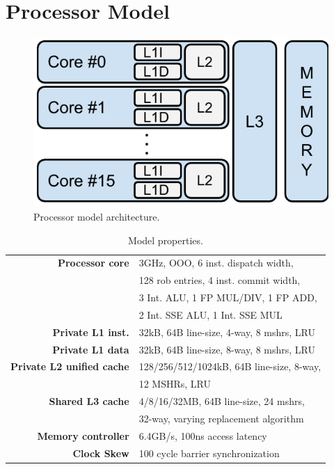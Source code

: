\section{Processor Model}
\label{sec:methodology:processor_model}

\begin{figure}[ht]
\centering
\includegraphics[scale=.65]{figures/processor_model/processor_model}
\caption{Processor model architecture.}
\label{fig:processor_model}
\end{figure}

\begin{table}[ht]
\centering
\begin{tabular}{rl}
\toprule
\bf{Processor core}                 & 3GHz, OOO, 6 inst. dispatch width,     \\
                                    & 128 rob entries, 4 inst. commit width, \\
                                    & 3 Int. ALU, 1 FP MUL/DIV, 1 FP ADD, \\
                                    & 2 Int. SSE ALU, 1 Int. SSE MUL \\
\bf{Private L1 inst.}               & 32kB, 64B line-size, 4-way, 8 mshrs, LRU \\
\bf{Private L1 data}                & 32kB, 64B line-size, 8-way, 8 mshrs, LRU \\
\bf{Private L2 unified cache}       & 128/256/512/1024kB, 64B line-size, 8-way, \\
                                    & 12 MSHRs, LRU      \\
\bf{Shared L3 cache}                & 4/8/16/32MB, 64B line-size, 24 mshrs, \\
                                    & 32-way, varying replacement algorithm         \\
\bf{Memory controller}              & 6.4GB/s, 100ns access latency         \\
\bf{Clock Skew}                     & 100 cycle barrier synchronization        \\
\bottomrule                             
\end{tabular}
\caption{Model properties.}
\label{tbl:processor_model:properties}
\end{table}

